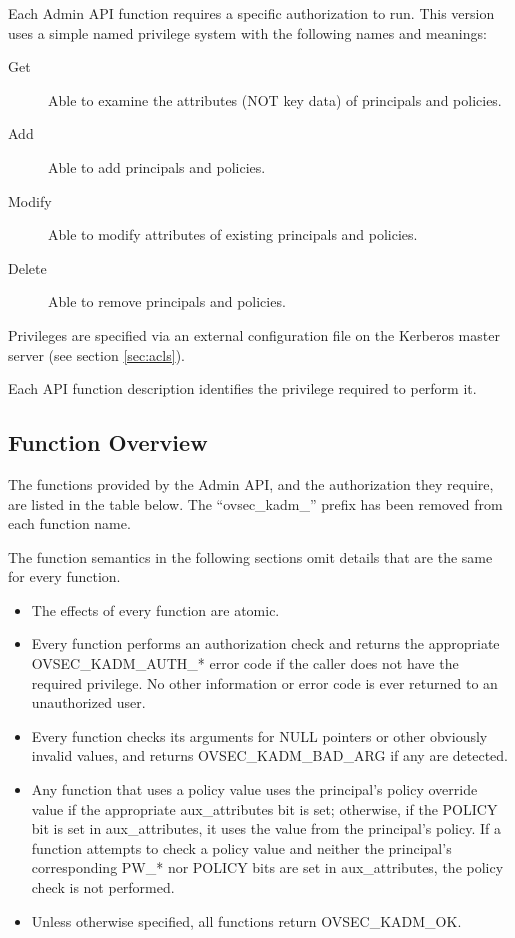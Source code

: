 Each Admin API function requires a specific authorization to run.
This version uses a simple named privilege system with the following
names and meanings:

\begin{description}
\item[Get] Able to examine the attributes (NOT key data) of principals
and policies. 
\item[Add] Able to add principals and policies.
\item[Modify] Able to modify attributes of existing principals and policies.
\item[Delete] Able to remove principals and policies.
\end{description}

Privileges are specified via an external configuration file on the
Kerberos master server (see section \ref{sec:acls}).

Each API function description identifies the privilege required to
perform it.

\subsection{Function Overview}

The functions provided by the Admin API, and the authorization they
require, are listed in the table below.  The ``ovsec_kadm_'' prefix
has been removed from each function name.

The function semantics in the following sections omit details that are
the same for every function.

\begin{itemize}
\item The effects of every function are atomic.

\item Every function performs an authorization check and returns
the appropriate OVSEC_KADM_AUTH_* error code if the caller does not
have the required privilege.  No other information or error code is
ever returned to an unauthorized user.

\item Every function checks its arguments for NULL pointers or other
obviously invalid values, and returns OVSEC_KADM_BAD_ARG if any are
detected.

\item Any function that uses a policy value uses the principal's
policy override value if the appropriate aux_attributes bit is set;
otherwise, if the POLICY bit is set in aux_attributes, it uses the
value from the principal's policy.  If a function attempts to check a
policy value and neither the principal's corresponding PW_* nor POLICY
bits are set in aux_attributes, the policy check is not performed.

\item Unless otherwise specified, all functions return OVSEC_KADM_OK.
\end{itemize}

